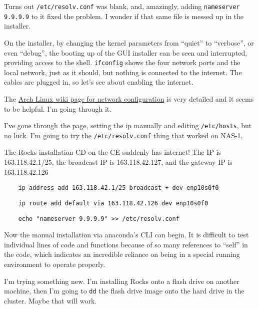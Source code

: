 \documentclass[12pt]{article}
\begin{document}
\qq Turns out {\tt /etc/resolv.conf} was blank, and, amazingly, adding
{\tt nameserver 9.9.9.9} to it fixed the problem. I wonder if that same file is
messed up in the installer.

\qq On the installer, by changing the kernel parameters from ``quiet'' to
``verbose'', or even ``debug'', the booting up of the GUI installer can be seen
and interrupted, providing access to the shell. {\tt ifconfig} shows the four
network ports and the local network, just as it should, but nothing is connected
to the internet. The cables are plugged in, so let's see about enabling the
internet.

\qq The \href{https://wiki.archlinux.org/index.php/Network_configuration}{Arch
  Linux wiki page for network configuration} is very detailed and it seems to be
helpful. I'm going through it.

\qq I've gone through the page, setting the ip manually and editing
{\tt /etc/hosts}, but no luck. I'm going to try the {\tt /etc/resolv.conf} thing
that worked on NAS-1.

\qq The Rocks installation CD on the CE suddenly has internet!  The IP is
163.118.42.1/25, the broadcast IP is 163.118.42.127, and the gateway IP is
163.118.42.126 

\begin{tcolorbox}[title=Enable Internet in Boot CD, colback=white,
  colframe=black, coltitle=green]
  \begin{verbatim}
    ip address add 163.118.42.1/25 broadcast + dev enp10s0f0
  \end{verbatim}
  \begin{verbatim}
    ip route add default via 163.118.42.126 dev enp10s0f0
  \end{verbatim}
  \begin{verbatim}
    echo "nameserver 9.9.9.9" >> /etc/resolv.conf
  \end{verbatim}
\end{tcolorbox}

\qq Now the manual installation via anaconda's CLI can begin.  It is difficult
to test individual lines of code and functions because of so many references to
``self'' in the code, which indicates an incredible reliance on being in a
special running environment to operate properly.

\qq I'm trying something new. I'm installing Rocks onto a flash drive on another
machine, then I'm going to {\tt dd} the flash drive image onto the hard drive in
the cluster. Maybe that will work.
\end{document}
